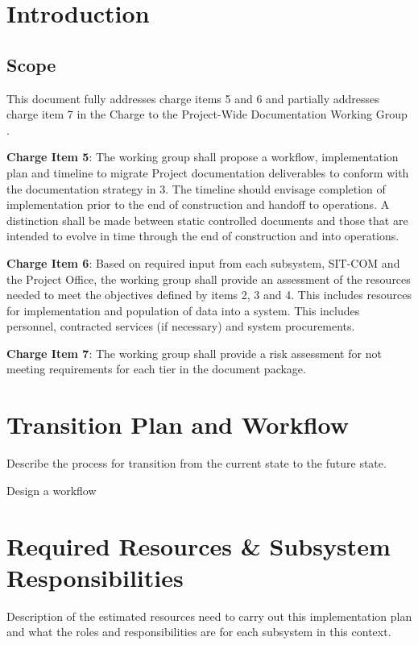 \section{Introduction}

\subsection{Scope}

This document fully addresses charge items 5 and 6 and partially addresses charge item 7 in the Charge to the Project-Wide Documentation Working Group . 

\textbf{Charge Item 5}: The working group shall propose a workflow, implementation plan and timeline to migrate Project documentation deliverables to conform with the documentation strategy in 3. The timeline should envisage completion of implementation prior to the end of
construction and handoff to operations. A distinction shall be made between static controlled documents and those that are intended to evolve in time through the end of
construction and into operations.

\textbf{Charge Item 6}: Based on required input from each subsystem, SIT-COM and the Project Office, the working group shall provide an assessment of the resources needed to meet the objectives defined by items 2, 3 and 4. This includes resources for implementation and population of data into a system. This includes personnel, contracted services (if necessary) and system procurements.

\textbf{Charge Item 7}: The working group shall provide a risk assessment for not meeting requirements for
each tier in the document package.

\section{Transition Plan and Workflow}

Describe the process for transition from the current state to the future state.

Design a workflow

\section{Required Resources \& Subsystem Responsibilities}

Description of the estimated resources need to carry out this implementation plan and what the roles and responsibilities are for each subsystem in this context.

